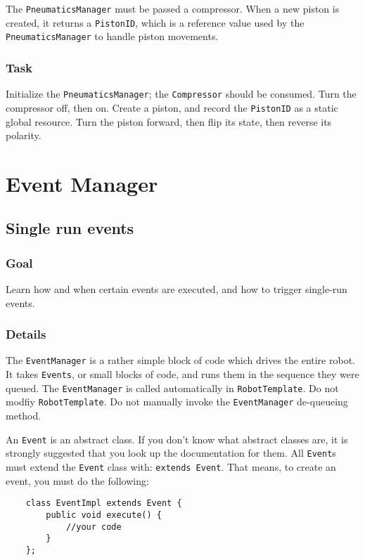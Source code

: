 \documentclass[a4paper]{article}
\begin{document}
The \lstinline{PneumaticsManager} must be passed a compressor. When a new piston is created, it returns a \lstinline{PistonID}, which is a reference value used by the \lstinline{PneumaticsManager} to handle piston movements.
\subsubsection{Task} Initialize the \lstinline{PneumaticsManager}; the \lstinline{Compressor} should be consumed. Turn the compressor off, then on. Create a piston, and record the \lstinline{PistonID} as a static global resource. Turn the piston forward, then flip its state, then reverse its polarity.


\pagebreak\section{Event Manager}\setcounter{subsection}{8}

\subsection{Single run events}
\subsubsection{Goal} Learn how and when certain events are executed, and how to trigger single-run events.
\subsubsection{Details} The \lstinline{EventManager} is a rather simple block of code which drives the entire robot. It takes \lstinline{Events}, or small blocks of code, and runs them in the sequence they were queued. The \lstinline{EventManager} is called automatically in \lstinline{RobotTemplate}. Do not modfiy \lstinline{RobotTemplate}. Do not manually invoke the \lstinline{EventManager} de-queueing method.

An \lstinline{Event} is an abstract class. If you don't know what abstract classes are, it is strongly suggested that you look up the documentation for them. All \lstinline{Event}s must extend the \lstinline{Event} class with: \lstinline{extends Event}. That means, to create an event, you must do the following:

\begin{lstlisting}
	class EventImpl extends Event {
		public void execute() {
			//your code
		}
	};
\end{lstlisting}
\end{document}
